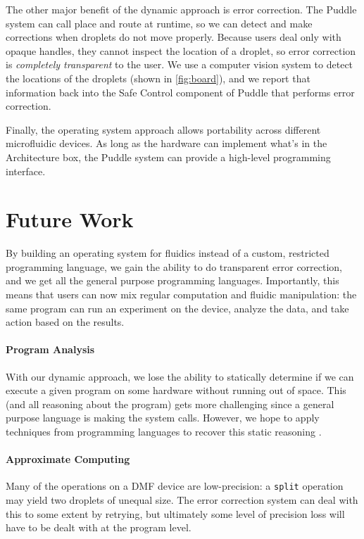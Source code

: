 \documentclass[
  10pt,
  a4paper,
  twocolumn,
]{article}
\begin{document}
The other major benefit of the dynamic approach is error correction.
The Puddle system can call place and route at runtime, so we can detect and make corrections when droplets do not move properly.
Because users deal only with opaque handles, they cannot inspect the location of a droplet, so error correction is \emph{completely transparent} to the user.
We use a computer vision system to detect the locations of the droplets (shown in \autoref{fig:board}), and we report that information back into the \textsf{Safe Control} component of Puddle that performs error correction.

Finally, the operating system approach allows portability across different microfluidic devices.
As long as the hardware can implement what's in the \textsf{Architecture} box, the Puddle system can provide a high-level programming interface.

\section*{Future Work}

By building an operating system for fluidics instead of a custom, restricted programming language, we gain the ability to do transparent error correction, and we get all the general purpose programming languages.
Importantly, this means that users can now mix regular computation and fluidic manipulation: the same program can run an experiment on the device, analyze the data, and take action based on the results.

\paragraph{Program Analysis}
With our dynamic approach, we lose the ability to statically determine if we can execute a given program on some hardware without running out of space.
This (and all reasoning about the program) gets more challenging since a general purpose language is making the system calls.
However, we hope to apply techniques from programming languages to recover this static reasoning \cite{obt18}.

\paragraph{Approximate Computing}
Many of the operations on a DMF device are low-precision: a \texttt{split} operation may yield two droplets of unequal size.
The error correction system can deal with this to some extent by retrying, but ultimately some level of precision loss will have to be dealt with at the program level.
\end{document}
